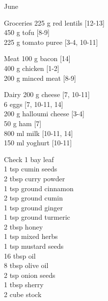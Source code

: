 \begin{menu}{June}
\begin{shoppinglist}{Groceries}
      225 g red lentils {\scriptsize[12-13]}\\
      450 g tofu {\scriptsize[8-9]}\\
      225 g tomato puree {\scriptsize[3-4, 10-11]}\\
      \end{shoppinglist}%
      \par\vfil %
      \begin{shoppinglist}{Meat}
      100 g bacon {\scriptsize[14]}\\
      400 g chicken {\scriptsize[1-2]}\\
      200 g minced meat {\scriptsize[8-9]}\\
      \end{shoppinglist}%
      \begin{shoppinglist}{Dairy}
      200 g cheese {\scriptsize[7, 10-11]}\\
      6  eggs {\scriptsize[7, 10-11, 14]}\\
      200 g halloumi cheese {\scriptsize[3-4]}\\
      50 g ham {\scriptsize[7]}\\
      800 ml milk {\scriptsize[10-11, 14]}\\
      150 ml yoghurt {\scriptsize[10-11]}\\
      \end{shoppinglist}%
      \par\vfil %
      \vfil\clearpage %
      \begin{shoppinglist}{Check}
      1  bay leaf \\
      1 tsp cumin seeds \\
      2 tbsp curry powder \\
      1 tsp ground cinnamon \\
      2 tsp ground cumin \\
      1 tsp ground ginger \\
      1 tsp ground turmeric \\
      2 tbsp honey \\
      1 tsp mixed herbs \\
      1 tsp mustard seeds \\
      16 tbsp oil \\
      8 tbsp olive oil \\
      2 tsp onion seeds \\
      1 tbsp sherry \\
      2 cube stock \\

\end{shoppinglist}
\end{menu}
